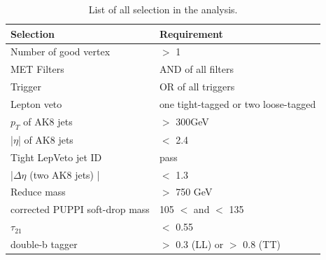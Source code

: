 \begin{table}[h!]
  \begin{center}
    \begin{tabular}{ll}
    Selection & Requirement \\
    \hline
    Number of good vertex & $>$ 1 \\
    MET Filters & AND of all filters\\
	Trigger & OR of all triggers\\
	Lepton veto & one tight-tagged or two loose-tagged \\
    $p_{T}$ of AK8 jets & $>$ 300GeV \\
	|$\eta$| of AK8 jets & $<$ 2.4 \\
	Tight LepVeto jet ID & pass \\
	|$\Delta \eta $ (two AK8 jets) | & $<$ 1.3 \\
	Reduce mass & $>$ 750 GeV \\
	corrected PUPPI soft-drop mass & 105 $<$ and $<$ 135 \\
	$\tau _{21}$ & $<$ 0.55 \\
	double-b tagger & $>$ 0.3 (LL) or $>$ 0.8 (TT)\\
	\hline
    \end{tabular}
  \end{center}

  \caption{List of all selection in the analysis.}
\end{table} 

